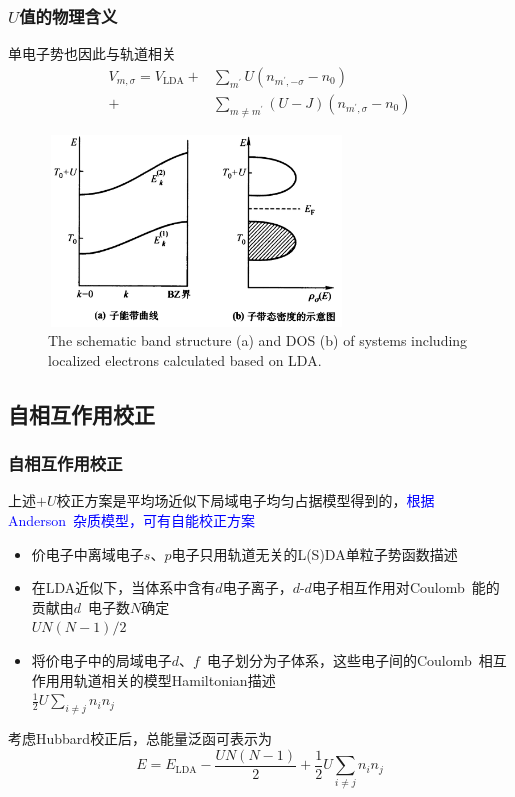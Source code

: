 \frame
{
	\frametitle{$U$值的物理含义}
	单电子势也因此与轨道相关
	\begin{displaymath}
		\begin{aligned}
			V_{m,\sigma}=V_{\mathrm{LDA}}+&\sum_{m^{\prime}}U(n_{m^{\prime},-\sigma}-n_0)\\
			+&\sum_{m\neq m^{\prime}}(U-J)(n_{m^{\prime},\sigma}-n_0)
		\end{aligned}
	\end{displaymath}
\begin{figure}[h!]
\centering
\vspace*{-0.25in}
\includegraphics[height=2.0in,width=3.1in,viewport=0 0 1250 880,clip]{Figures/LDA_U-4.png}
\caption{\tiny \textrm{The schematic band structure (a) and DOS (b) of systems including localized electrons calculated based on LDA.}}%
\label{LDA_U-4}
\end{figure}
}

\subsection{自相互作用校正}
\frame
{
	\frametitle{自相互作用校正}
	上述$+U$校正方案是平均场近似下局域电子均匀占据模型得到的，\textcolor{blue}{根据\textrm{Anderson~}杂质模型，可有自能校正方案}
	\begin{itemize}
		\item 价电子中离域电子$s$、$p$电子只用轨道无关的\textrm{L(S)DA}单粒子势函数描述
		\item 在\textrm{LDA}近似下，当体系中含有$d$电子离子，$d$-$d$电子相互作用对\textrm{Coulomb~}能的贡献由$d$~电子数$N$确定\\$UN(N-1)/2$
		\item 将价电子中的局域电子$d$、$f$~电子划分为子体系，这些电子间的\textrm{Coulomb}~相互作用用轨道相关的模型\textrm{Hamiltonian}描述\\$\frac12U\sum\limits_{i\neq j}n_in_j$
	\end{itemize}
	考虑\textrm{Hubbard}校正后，总能量泛函可表示为
	$$E=E_{\mathrm{LDA}}-\frac{UN(N-1)}2+\frac12U\sum\limits_{i\neq j}n_in_j$$
}

